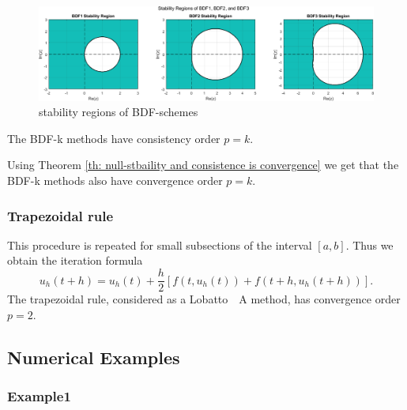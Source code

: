 	\begin{frame}
		\begin{figure}[H]
			\centering
			\includegraphics[width=0.8\linewidth]{../Tex/pictures/bdf_stability_regions.png}
			\caption{stability regions of BDF-schemes}
			\label{fig:screenshot020}
		\end{figure}
		\begin{theorem}%
			The BDF-k methods have consistency order $p=k$.
		\end{theorem}
		Using Theorem \ref{th: null-stbaility and consistence is convergence} we get that the BDF-k methods also have convergence order $p=k$.
	\end{frame}
	
	\subsubsection{Trapezoidal rule}
	
	\begin{frame}
		\vfill
		This procedure is repeated for small subsections of the interval $[a,b]$. Thus we obtain the iteration formula
		\begin{displaymath}
			u_h (t+h) = u_h(t) +\frac{h}{2}[f(t,u_h(t)) + f(t+h, u_h(t+h))].
		\end{displaymath}
		The trapezoidal rule, considered as a Lobatto~~A method, has convergence order $p=2$.
		\vfill
	\end{frame}
	
	\subsection*{Numerical Examples}
	
	\subsubsection{Example1}
	
